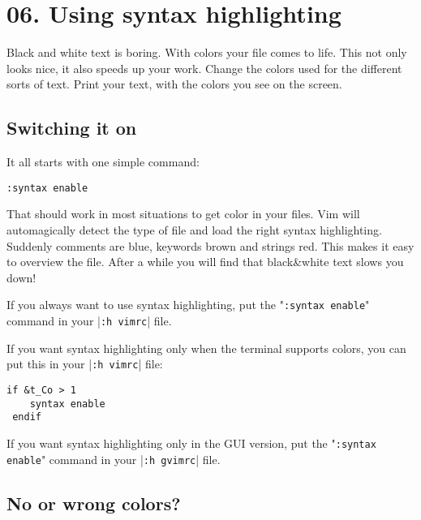 \section{06. Using syntax highlighting}
\label{Using syntax highlighting}
Black and white text is boring.  With colors your file comes to life.  This
not only looks nice, it also speeds up your work.  Change the colors used for
the different sorts of text.  Print your text, with the colors you see on the
screen.
\subsection{Switching it on}

It all starts with one simple command:

 \begin{Verbatim}[samepage=true]
 :syntax enable
 \end{Verbatim}

That should work in most situations to get color in your files.
Vim will automagically detect the type of file and load the right syntax highlighting.
Suddenly comments are blue, keywords brown and strings red.
This makes it easy to overview the file.
After a while you will find that black\&white text slows you down!

If you always want to use syntax highlighting, put the "\verb!:syntax enable!" command in your |\verb!:h vimrc!| file.

If you want syntax highlighting only when the terminal supports colors, you can put this in your |\verb!:h vimrc!| file:

 \begin{Verbatim}[samepage=true]
 if &t_Co > 1
    syntax enable
 endif
 \end{Verbatim}

If you want syntax highlighting only in the GUI version, put the "\verb!:syntax enable!" command in your |\verb!:h gvimrc!| file.

\subsection{No or wrong colors?}
\label{No or wrong colors?}


